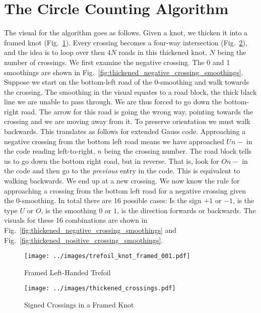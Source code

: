 \documentclass{article}
\theoremstyle{plain}
\begin{document}
    \section{The Circle Counting Algorithm}
        The visual for the algorithm goes as follows. Given a knot, we thicken
        it into a framed knot (Fig.~\ref{fig:trefoil_knot_framed_001}). Every
        crossing becomes a four-way intersection
        (Fig.~\ref{fig:thickened_crossings}), and the idea is to loop
        over then $4N$ roads in this thickened knot, $N$ being the number of
        crossings. We first examine the negative crossing. The 0 and 1
        smoothings are shown in
        Fig.~\ref{fig:thickened_negative_crossing_smoothings}. Suppose we start
        on the bottom-left road of the 0-smoothing and walk towards the
        crossing. The smoothing in the visual equates to a road block, the thick
        black line we are unable to pass through. We are thus forced to go down
        the bottom-right road. The arrow for this road is going the wrong way,
        pointing towards the crossing and we are moving away from it.
        To preserve orientation we must walk backwards. This
        translates as follows for extended Gauss code. Approaching a negative
        crossing from the bottom left road means we have approached $Un-$ in
        the code reading left-to-right, $n$ being the crossing number. The
        road block tells us to go down the bottom right road, but in reverse.
        That is, look for $On-$ in the code and then go
        to the \textit{previous} entry in the code.
        This is equivalent to walking backwards. We end up at a new crossing.
        We now know the rule for approaching a crossing from the bottom left
        road for a negative crossing given the 0-smoothing. In total there are
        16 possible cases: Is the sign $+1$ or $-1$, is the type $U$ or $O$, is
        the smoothing $0$ or $1$, is the direction forwards or backwards. The
        visuals for these 16 combinations are shown in
        Fig.~\ref{fig:thickened_negative_crossing_smoothings} and
        Fig.~\ref{fig:thickened_positive_crossing_smoothings}.
        \par\hfill\par
        \begin{figure}
            \centering
            \texttt{[image: ../images/trefoil\_knot\_framed\_001.pdf]}
            \caption{Framed Left-Handed Trefoil}
            \label{fig:trefoil_knot_framed_001}
        \end{figure}
        \begin{figure}
            \centering
            \texttt{[image: ../images/thickened\_crossings.pdf]}
            \caption{Signed Crossings in a Framed Knot}
            \label{fig:thickened_crossings}
        \end{figure}
\end{document}
